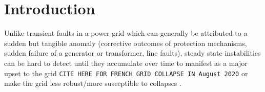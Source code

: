 \section[Introduction]{Introduction}

Unlike transient faults in a power grid which can generally be attributed to a sudden but tangible anomaly (corrective outcomes of protection mechanisms, sudden failure of a generator or transformer, line faults), steady state instabilities can be hard to detect until they accumulate over time to manifest as a major upset to the grid \verb|CITE HERE FOR FRENCH GRID COLLAPSE IN August 2020| or make the grid less robust/more susceptible to collapses \cite{schafer01}.

